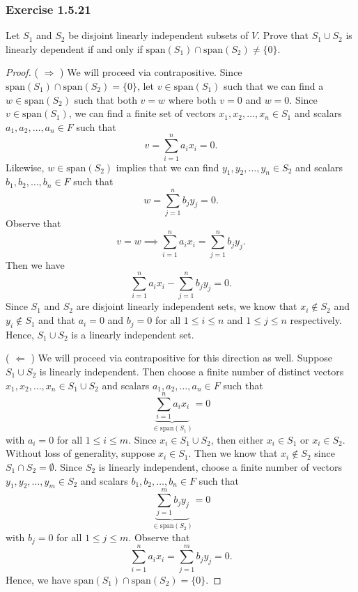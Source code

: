 \subsubsection{Exercise 1.5.21} Let \( S_{1}  \) and \( S_{2}  \) be disjoint linearly independent subsets of \( V  \). Prove that \( S_{1} \cup S_{2}  \) is linearly dependent if and only if \( \text{span}(S_{1}) \cap  \text{span}(S_{2} ) \neq \{ 0  \}  \).
\begin{proof}
    ( \( \Rightarrow \) ) We will proceed via contrapositive. Since \( \text{span}(S_{1}) \cap \text{span}(S_{2}) = \{ 0  \}  \), let \( v \in \text{span}(S_{1}) \) such that we can find a \( w \in \text{span}(S_{2}) \) such that both  \( v = w   \) where both \( v =0  \) and \( w = 0  \). Since \( v \in \text{span}(S_{1}) \), we can find a finite set of vectors \( x_{1}, x_{2}, \dots, x_{n} \in S_{1} \) and scalars \( a_{1} , a_{2} , \dots, a_{n} \in F  \) such that 
    \[ v =  \sum_{ i=1 }^{ n } a_{i} x_{i} = 0.  \]
    Likewise, \( w \in \text{span}(S_{2}) \) implies that we can find \( y_{1}, y_{2}, \dots, y_{n} \in S_{2} \) and scalars \( b_{1}, b_{2} , \dots, b_{n} \in F  \) such that 
    \[ w = \sum_{ j=1 }^{ n } b_{j} y_{j} = 0.   \]
    Observe that 
    \[  v = w \implies \sum_{ i=1 }^{ n } a_{i} x_{i} = \sum_{ j=1 }^{ n } b_{j}y_{j}.  \]
    Then we have
    \[  \sum_{ i=1 }^{ n } a_{i} x_{i} - \sum_{ j=1 }^{ n } b_{j} y_{j} = 0. \] Since \( S_{1} \) and \( S_{2}  \) are disjoint linearly independent sets, we know that \( x_{i} \notin S_{2}  \) and \( y_{i} \notin S_{1} \) and that \( a_{i} = 0  \) and \( b_{j} = 0  \) for all \( 1 \leq i \leq n  \) and \( 1 \leq j \leq n \) respectively. Hence, \( S_{1} \cup S_{2}  \) is a linearly independent set.

    ( \( \Leftarrow  \) ) We will proceed via contrapositive for this direction as well. Suppose \( S_{1} \cup S_{2}  \) is linearly independent. Then choose a finite number of distinct vectors \( x_{1}, x_{2}, \dots, x_{n} \in S_{1} \cup S_{2} \) and scalars \( a_{1}, a_{2}, \dots, a_{n} \in  F \) such that      
    \[  \underbrace{\sum_{ i=1 }^{ n } a_{i} x_{i}}_{\in \text{span}(S_{1})} = 0  \] with \( a_{i} = 0  \) for all \( 1 \leq i \leq m  \). Since \( x_{i} \in S_{1} \cup S_{2}  \), then either \( x_{i} \in S_{1}  \) or \( x_{i} \in S_{2} \). Without loss of generality, suppose \( x_{i} \in S_{1} \). Then we know that \( x_{i} \notin S_{2} \) since \( S_{1} \cap S_{2} = \emptyset \). Since \( S_{2} \) is linearly independent, choose a finite number of vectors \(y_{1}, y_{2}, \dots, y_{m} \in S_{2} \) and scalars \( b_{1}, b_{2}, \dots, b_{n} \in F  \) such that 
    \[  \underbrace{\sum_{ j=1 }^{ m } b_{j} y_{j}}_{\in \text{span}(S_{2})} = 0  \] with \( b_{j} = 0  \) for all \( 1 \leq j \leq m  \). Observe that 
    \[  \sum_{ i=1 }^{ n } a_{i} x_{i} = \sum_{ j=1 }^{ m } b_{j} y_{j} = 0. \] Hence, we have \( \text{span}(S_{1}) \cap \text{span}(S_{2}) = \{ 0  \}  \).
\end{proof}
